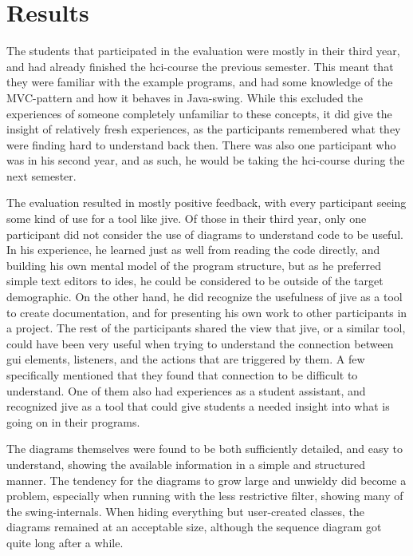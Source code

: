 \section{Results}\label{jiveEvalResults}
The students that participated in the evaluation were mostly in their third year, and had already finished the \gls{hci}-course the previous semester.
This meant that they were familiar with the example programs, and had some knowledge of the MVC-pattern and how it behaves in Java-swing.
While this excluded the experiences of someone completely unfamiliar to these concepts, it did give the insight of relatively fresh experiences, as the participants remembered what they were finding hard to understand back then.
There was also one participant who was in his second year, and as such, he would be taking the \gls{hci}-course during the next semester.

The evaluation resulted in mostly positive feedback, with every participant seeing some kind of use for a tool like \gls{jive}.
Of those in their third year, only one participant did not consider the use of diagrams to understand code to be useful.
In his experience, he learned just as well from reading the code directly, and building his own mental model of the program structure, but as he preferred simple text editors to \gls{ide}s, he could be considered to be outside of the target demographic.
On the other hand, he did recognize the usefulness of \gls{jive} as a tool to create documentation, and for presenting his own work to other participants in a project.
The rest of the participants shared the view that \gls{jive}, or a similar tool, could have been very useful when trying to understand the connection between \gls{gui} elements, listeners, and the actions that are triggered by them.
A few specifically mentioned that they found that connection to be difficult to understand.
One of them also had experiences as a student assistant, and recognized \gls{jive} as a tool that could give students a needed insight into what is going on in their programs.

The diagrams themselves were found to be both sufficiently detailed, and easy to understand, showing the available information in a simple and structured manner.
The tendency for the diagrams to grow large and unwieldy did become a problem, especially when running with the less restrictive filter, showing many of the swing-internals.
When hiding everything but user-created classes, the diagrams remained at an acceptable size, although the sequence diagram got quite long after a while.

